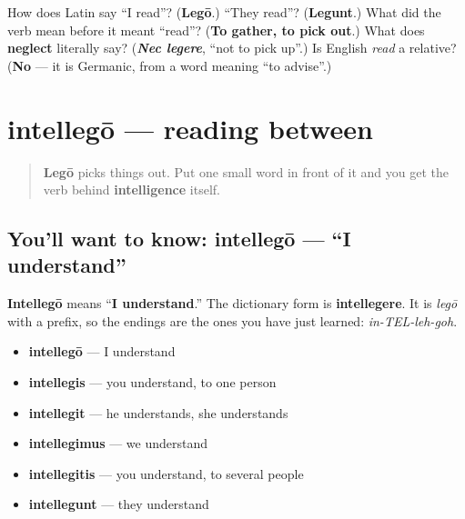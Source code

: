 \begin{tcolorbox}[breakable,colback=teal!4,colframe=teal!35!black,title={Before you move on}]
How does Latin say \textquotedblleft{}I read\textquotedblright{}? (\textbf{Legō}.) \textquotedblleft{}They read\textquotedblright{}? (\textbf{Legunt}.) What did the verb mean before it meant \textquotedblleft{}read\textquotedblright{}? (\textbf{To gather, to pick out}.) What does \textbf{neglect} literally say? (\emph{\textbf{Nec legere}}, \textquotedblleft{}not to pick up\textquotedblright{}.) Is English \emph{read} a relative? (\textbf{No} — it is Germanic, from a word meaning \textquotedblleft{}to advise\textquotedblright{}.)
\end{tcolorbox}
\section[intellegō, intellegere]{intellegō — reading between}

\label{lesson:LA-C38-intellego}



\begin{quote}
\textbf{Legō} picks things out. Put one small word in front of it and you get the verb behind \textbf{intelligence} itself.
\end{quote}

\subsection*{You'll want to know: intellegō — \textquotedblleft{}I understand\textquotedblright{}}
\textbf{Intellegō} means \textquotedblleft{}\textbf{I understand}.\textquotedblright{} The dictionary form is \textbf{intellegere}. It is \emph{legō} with a prefix, so the endings are the ones you have just learned: \emph{in-TEL-leh-goh}.

\begin{itemize}
\raggedright
  \item \textbf{intellegō} — I understand
  \item \textbf{intellegis} — you understand, to one person
  \item \textbf{intellegit} — he understands, she understands
  \item \textbf{intellegimus} — we understand
  \item \textbf{intellegitis} — you understand, to several people
  \item \textbf{intellegunt} — they understand
\end{itemize}

